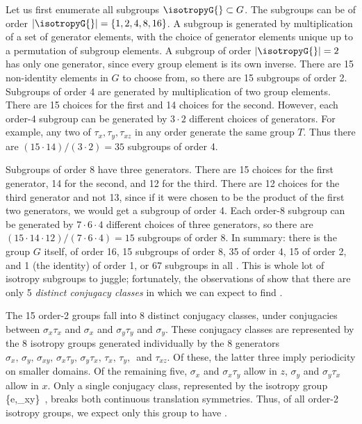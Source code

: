 Let us first enumerate all subgroups $\isotropyG{} \subset G$.
The subgroups can be of order
$|\isotropyG{}| = \{1,2,4,8,16\}$.
A subgroup is generated by multiplication of a set of
generator elements, with the choice of
generator elements unique up to a permutation of subgroup
elements.
A subgroup of order $|\isotropyG{}| =  2$ has only one generator,
since every group element is its own inverse. There are 15
non-identity elements in $G$ to choose from, so there are 15 subgroups
of order 2.
Subgroups of order 4 are generated by multiplication of two
group elements. There are 15 choices for the first and 14
choices for the second. However, each order-4 subgroup
can be generated by $3 \cdot 2$ different choices of generators.
For example, any two of $\tau_x, \tau_y, \tau_{xz}$ in any order
generate the same group $T$. Thus there are $(15 \cdot 14)/(3 \cdot 2) = 35$
subgroups of order 4.

Subgroups of order 8 have three generators.  There are
15 choices for the first generator, 14 for the second, and 12 for the
third. There are 12 choices for the third
generator and not  13, since if it were chosen to be the product of the
first two generators, we would get a subgroup of order 4.
Each order-8 subgroup can be generated
by $7 \cdot 6 \cdot 4$ different choices of three generators, so there are
$(15 \cdot 14 \cdot 12)/(7 \cdot 6 \cdot 4) = 15$ subgroups of order 8.
In summary: there is the group $G$ itself, of order 16,
15 subgroups of order 8, 35 of order 4, 15 of
order 2, and 1 (the identity) of order 1,
or 67 subgroups in all .
This is whole lot of isotropy subgroups to juggle; fortunately,
the observations of  show that there
are only 5 {\em distinct conjugacy classes} in which we can expect
to find \eqva.

The 15 order-2 groups fall into 8 distinct conjugacy
classes, under conjugacies between $\sigma_x \tau_x$ and $\sigma_x$
and $\sigma_y \tau_y$ and $\sigma_y$. These conjugacy classes are
represented by the 8 isotropy groups generated individually by the 8
generators
$\sigma_x,\, \sigma_y,\, \sigma_{xy},\, \sigma_x \tau_y,\,  \sigma_y \tau_x,\,
\tau_x,\, \tau_y,\,$ and $\tau_{xz}$. Of these, the latter three imply
periodicity on smaller domains. Of the remaining five,
$\sigma_x$ and $\sigma_x \tau_y$ allow {\reqva} in $z$,
$\sigma_y$ and $\sigma_y \tau_x$ allow {\reqva} in $x$.
Only a single conjugacy class, represented by the isotropy
group
\beq
  \{e,\sigma_{xy}\}
\,,
breaks both continuous translation symmetries. Thus, of all
order-2  isotropy groups, we expect only this group to have {\eqva}.

